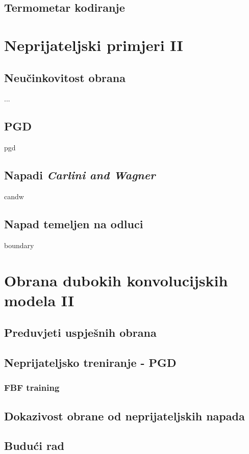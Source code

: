 \documentclass[utf8, diplomski]{fer}
\begin{document}
\section{Termometar kodiranje}

\chapter{Neprijateljski primjeri II}
\section{Neučinkovitost obrana} ...
\section{PGD} pgd\citep{Madry2017TowardsDL}
\section{Napadi \textit{Carlini and Wagner}} candw\citep{Carlini2017TowardsET}
\section{Napad temeljen na odluci} boundary\citep{Brendel2017DecisionBasedAA}

\chapter{Obrana dubokih konvolucijskih modela II}
\section{Preduvjeti uspješnih obrana}
\section{Neprijateljsko treniranje - PGD}
\subsection{FBF training}
\section{Dokazivost obrane od neprijateljskih napada}
\section{Budući rad}
\end{document}
